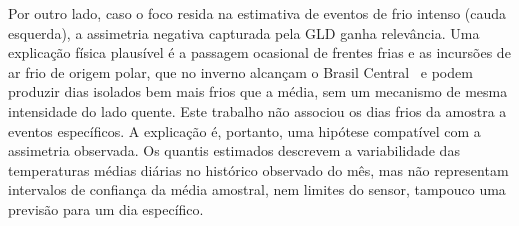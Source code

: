 Por outro lado, caso o foco resida na estimativa de eventos de frio intenso (cauda esquerda), a assimetria negativa capturada pela GLD ganha relevância. Uma explicação física plausível é a passagem ocasional de frentes frias e as incursões de ar frio de origem polar, que no inverno alcançam o Brasil Central~\cite{garreaud2000} e podem produzir dias isolados bem mais frios que a média, sem um mecanismo de mesma intensidade do lado quente. Este trabalho não associou os dias frios da amostra a eventos específicos. A explicação é, portanto, uma hipótese compatível com a assimetria observada. Os quantis estimados descrevem a variabilidade das temperaturas médias diárias no histórico observado do mês, mas não representam intervalos de confiança da média amostral, nem limites do sensor, tampouco uma previsão para um dia específico.
